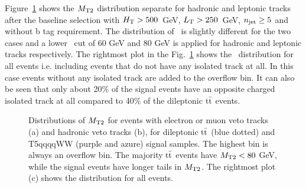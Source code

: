 Figure~\ref{fig:track_mt2} shows the $\MTt$ distribution separate for hadronic and leptonic tracks after the baseline selection with $H_{\rm T} > 500$~GeV, $L_{\rm T} > 250$~GeV,  $n_{\rm jet} \geq 5$ and without b tag requirement. The distribution of {\MTt\,} is slightly different for the two cases and a lower {\MTt\,} cut of $60$ GeV and $80$ GeV is applied for hadronic and leptonic tracks respectively. The rightmost plot in  the Fig.~\ref{fig:track_mt2}
shows the \MTt\, distribution for all events i.e. including events that do not have any isolated track at all. In this case events without any isolated track are added to the overflow bin. It can also be seen that only about 20\% of the signal events have an opposite charged isolated track at all compared to 40\% of the dileptonic $\rm t\bar{t}$ events.
 \begin{figure}[!h]
    \begin{center}
  \caption[Distributions of $\MTt$]{ \label{fig:track_mt2} Distributions of $\MTt$ for events with electron or muon veto tracks (a) and hadronic veto tracks (b), for dileptonic $\rm t\bar{t}$ (blue dotted) and T5qqqqWW (purple and azure) signal samples. The highest bin is always an overflow bin. The majority $\rm t\bar{t}$ events have $M_\mathrm{T2} < 80$ GeV, while the signal events have longer tails in $\MTt$. The rightmost plot (c) shows the distribution for all events. 
  }
   \end{center}
\end{figure}
